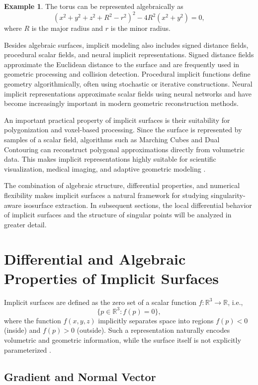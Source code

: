 \documentclass[12pt, a4paper, oneside]{book}
\theoremstyle{plain}
\theoremstyle{definition}
\newtheorem{example}[theorem]{Example}
\theoremstyle{remark}
\theoremstyle{definition}
\begin{document}
\begin{example}
The torus can be represented algebraically as
\[
\left(x^2+y^2+z^2+R^2-r^2\right)^2
-4R^2(x^2+y^2)=0,
\]
where $R$ is the major radius and $r$ is the minor radius.
\end{example}

Besides algebraic surfaces, implicit modeling also includes signed distance fields, procedural scalar fields, and neural implicit representations. Signed distance fields approximate the Euclidean distance to the surface and are frequently used in geometric processing and collision detection. Procedural implicit functions define geometry algorithmically, often using stochastic or iterative constructions. Neural implicit representations approximate scalar fields using neural networks and have become increasingly important in modern geometric reconstruction methods.

An important practical property of implicit surfaces is their suitability for polygonization and voxel-based processing. Since the surface is represented by samples of a scalar field, algorithms such as Marching Cubes and Dual Contouring can reconstruct polygonal approximations directly from volumetric data. This makes implicit representations highly suitable for scientific visualization, medical imaging, and adaptive geometric modeling \cite{bloomenthal2000implicit}.

The combination of algebraic structure, differential properties, and numerical flexibility makes implicit surfaces a natural framework for studying singularity-aware isosurface extraction. In subsequent sections, the local differential behavior of implicit surfaces and the structure of singular points will be analyzed in greater detail.

\section{Differential and Algebraic Properties of Implicit Surfaces}

Implicit surfaces are defined as the zero set of a scalar function $f:\mathbb{R}^3 \rightarrow \mathbb{R}$, i.e.,
\[
\{ p \in \mathbb{R}^3 : f(p) = 0 \},
\]
where the function $f(x,y,z)$ implicitly separates space into regions $f(p) < 0$ (inside) and $f(p) > 0$ (outside). Such a representation naturally encodes volumetric and geometric information, while the surface itself is not explicitly parameterized \cite{bloomenthal2000implicit}.

\subsection{Gradient and Normal Vector}
\end{document}
